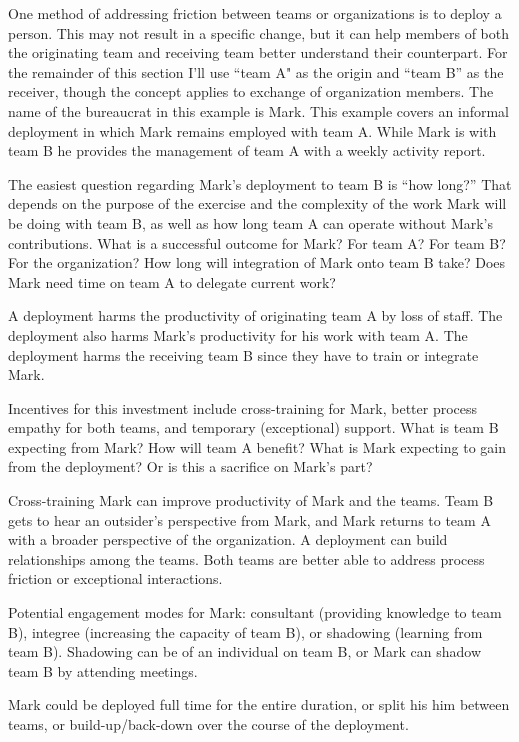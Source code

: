 One method of addressing friction between teams or organizations is to deploy a person. This may not result in a specific change, but it can help members of both the originating team and receiving team better understand their counterpart. For the remainder of this section I'll use ``team A" as the origin and ``team B'' as the receiver, though the concept applies to exchange of organization members. The name of the bureaucrat in this example is Mark. This example covers an informal deployment in which Mark remains employed with team A. While Mark is with team B he provides the management of team A with a weekly activity report. 

The easiest question regarding Mark's deployment to team B is ``how long?'' That depends on the purpose of the exercise and the complexity of the work Mark will be doing with team B, as well as how long team A can operate without Mark's contributions. What is a successful outcome for Mark? For team A? For team B? For the organization? How long will integration of Mark onto team B take? Does Mark need time on team A to delegate current work?

A deployment harms the productivity of originating team A by loss of staff. The deployment also harms Mark's productivity for his work with team A. The deployment harms the receiving team B since they have to train or integrate Mark. 

Incentives for this investment include cross-training for Mark, better process empathy for both teams, and temporary (exceptional) support. What is team B expecting from Mark? How will team A benefit? What is Mark expecting to gain from the deployment? Or is this a sacrifice on Mark's part? 

Cross-training Mark can improve productivity of Mark and the teams. 
Team B gets to hear an outsider's perspective from Mark, and Mark returns to team A with a broader perspective of the organization.
A deployment can build relationships among the teams. Both teams are better able to address process friction or exceptional interactions. 


Potential engagement modes for Mark: consultant (providing knowledge to team B), integree (increasing the capacity of team B), or shadowing (learning from team B). Shadowing can be of an individual on team B, or Mark can shadow team B by attending meetings. 


Mark could be deployed full time for the entire duration, or split his him between teams, or build-up/back-down over the course of the deployment.

